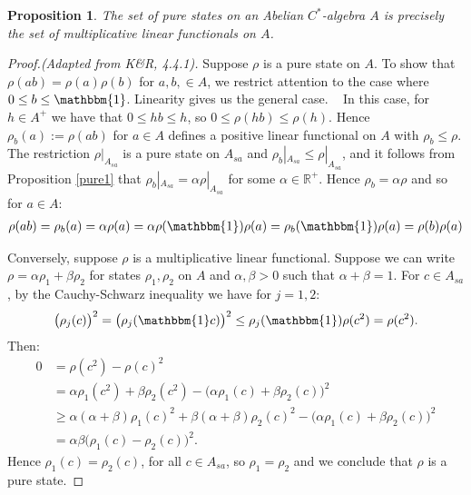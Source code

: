\documentclass[12pt,a4paper]{amsart}
\theoremstyle{plain}
\newtheorem{prop}{Proposition}
\theoremstyle{definition}
\newcommand{\1}{\mathbbm{1}}
\newcommand{\R}{\mathbb{R}}
\begin{document}
\begin{prop}\label{pure2}
	The set of pure states on an Abelian $C^\ast$-algebra $A$ is precisely the set 
	of multiplicative linear functionals on $A$.
\end{prop}
\begin{proof}[Proof.(Adapted from K\&R, 4.4.1)]
	Suppose $\rho$ is a pure state on $A$. To show that $\rho(ab)=\rho(a)\rho(b)$ for $a,b,\in A$,
	we restrict attention to the case where $0\leq b\leq\1$. Linearity gives us the general case. ~%
	In this case, for $h\in A^+$ we have that $0\leq hb\leq h$, so $0\leq\rho(hb)\leq\rho(h)$.
	Hence $\rho_b(a):=\rho(ab)$ for $a\in A$ defines a positive linear functional on $A$ 
	with $\rho_b\leq\rho$. 
	The restriction $\rho|_{A_{sa}}$ is a pure state on $A_{sa}$ and $\rho_b|_{A_{sa}} 
	\leq \rho|_{A_{sa}}$, and it follows from Proposition \ref{pure1} that $\rho_b|_{A_{sa}} = \alpha \rho|_{A_{sa}}$ 
	for some $\alpha \in \R^+$.
	Hence $\rho_b = \alpha\rho$  and so for $a\in A$:
	\begin{align*}
		\rho(ab) = \rho_b(a) = \alpha\rho(a) = 
							\alpha\rho(\1)\rho(a) = \rho_b(\1)\rho(a) = \rho(b)\rho(a)
	\end{align*}
	
	Conversely, suppose $\rho$ is a multiplicative linear functional.  %
	Suppose we can write $\rho=\alpha\rho_1+\beta\rho_2$ for states $\rho_1,\rho_2$ on $A$ and 
	$\alpha,\beta >0$ such that $\alpha+\beta=1$. For $c\in A_{sa}$, by the Cauchy-Schwarz inequality we have
	for $j=1,2$:
	\begin{align*}
		\big(\rho_j(c)\big)^2 = \big(\rho_j(\1 c)\big)^2 \leq \rho_j(\1)\rho(c^2)=\rho(c^2).
	\end{align*}
	Then:
	\begin{align*}
				0
		&=		\rho(c^2)-\rho(c)^2 											\\
		&=		\alpha\rho_1(c^2)+\beta\rho_2(c^2) 
						- \big(\alpha\rho_1(c)+\beta\rho_2(c)\big)^2			\\
		&\geq	\alpha(\alpha+\beta)\rho_1(c)^2 
						+ \beta(\alpha+\beta)\rho_2(c)^2
						- \big(\alpha\rho_1(c)+\beta\rho_2(c)\big)^2			\\
		&=		\alpha\beta\big(\rho_1(c) - \rho_2(c)\big)^2.
	\end{align*}
	Hence $\rho_1(c)=\rho_2(c)$, for all $c\in A_{sa}$, so $\rho_1=\rho_2$ and we conclude
	that $\rho$ is a pure state. 
\end{proof}
\end{document}
